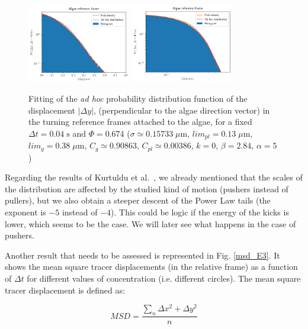 \begin{figure}[H]
	\centering
	\includegraphics[width=0.4\textwidth]{archivos/pdf_ylog_e3.png}
	\includegraphics[width=0.4\textwidth]{archivos/pdf_loglog_e3.png}
	\caption{Fitting of the \textit{ad hoc} probability distribution function of the displacement $|\Delta y|$, (perpendicular to the algae direction vector) in the turning reference frames attached to the algae, for a fixed $\Delta t = 0.04 \; \textrm{s}$ and $\Phi = 0.674$ ($\sigma \simeq 0.15733 \; \mu \textrm{m}$, $lim_{pl}=0.13 \; \mu \textrm{m}$, $lim_g=0.38 \; \mu \textrm{m}$, $C_g \simeq 0.90863$, $C_{pl} \simeq 0.00386$, $k = 0$, $\beta = 2.84$, $\alpha = 5$)}
	\label{e3_adhoc}
\end{figure}

Regarding the results of Kurtuldu et al.~\cite{Kurtuldu2011}, we already mentioned that the scales of the distribution are affected by the studied kind of motion (pushers instead of pullers), but we also obtain a steeper descent of the Power Law tails (the exponent is $-5$ instead of $-4$). This could be logic if the energy of the kicks is lower, which seems to be the case. We will later see what happens in the case of pushers.

Another result that needs to be assessed is represented in Fig. \ref{msd_E3}. It shows the mean square tracer displacements (in the relative frame) as a function of  $\Delta t$ for different values of concentration (i.e. different circles). The mean square tracer displacement is defined as:

\begin{equation}
MSD = \frac{\displaystyle\sum_{n} \Delta x ^ 2 + \Delta y ^ 2}{n}
\end{equation}

